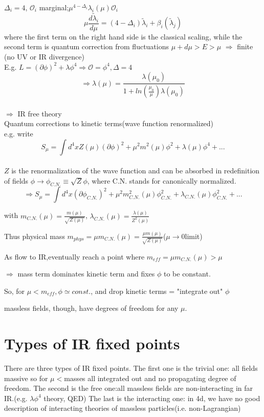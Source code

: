 \documentclass[type = bachelor]{fduthesis-en}
\begin{document}
$\Delta_i = 4$, $\mathcal{O}_i$ marginal;$\mu^{4-\Delta_i}\lambda_i(\mu)\mathcal{O}_i$\\
$$\mu\frac{d\tilde{\lambda}_i}{d\mu}=(4-\Delta_i)\tilde{\lambda}_i+\beta_i(\tilde{\lambda}_j)$$
where the first term on the right hand side is the classical scaling, while the second term is quantum correction from fluctuations $\mu +d\mu>E>\mu$ $\Rightarrow$ finite (no UV or IR divergence)
\\E.g. $L=(\partial\phi)^2+\lambda\phi^4 \Rightarrow \mathcal{O}=\phi^4, \Delta = 4$
\\$$\Rightarrow \lambda(\mu)=\frac{\lambda(\mu_0)}{1+ln(\frac{\mu_0}{\mu})\lambda(\mu_0)}$$
\\$\Rightarrow$ IR free theory\\
\bigskip Quantum corrections to kinetic terms(wave function renormalized)
\\e.g. write $$S_{\mu}=\int d^4x{Z(\mu)(\partial\phi)^2+\mu^2m^2(\mu)\phi^2+\lambda(\mu)\phi^4+...}$$\\
$Z$ is the renormalization of the wave function and can be absorbed in redefinition of fields $\phi \rightarrow \phi_{C.N.}\equiv \sqrt{Z}\phi$, where C.N. stands for canonically normalized.
$$\Rightarrow S_{\mu}=\int d^4x{(\partial\phi_{C.N.})^2+\mu^2m_{C.N.}^2(\mu)\phi_{C.N.}^2+\lambda_{C.N.}(\mu)\phi_{C.N.}^2+...}$$

with $m_{C.N.}(\mu)=\frac{m(\mu)}{\sqrt{Z(\mu)}}$, $\lambda_{C.N.}(\mu)=\frac{\lambda(\mu)}{Z^2(\mu)}$

Thus physical mass $m_{phys}=\mu m_{C.N.}(\mu)=\frac{\mu m(\mu)}{\sqrt{Z(\mu)}}$($\mu\rightarrow0$limit)

\bigskip As flow to IR,eventually reach a point where $m_{eff}=\mu m_{C.N.}(\mu)>\mu$

$\Rightarrow$ mass term dominates kinetic term and fixes $\phi$ to be constant.

So, for $\mu<m_{eff}, \phi\simeq const.$, and drop kinetic terms = "integrate out" $\phi$

massless fields, though, have degrees of freedom for any $\mu$.

\section{Types of IR fixed points}
There are three types of IR fixed points. The first one is the trivial one: all fields massive so for $\mu<$masses all integrated out and no propagating degree of freedom. The second is the free one:all massless fields are non-interacting in far IR.(e.g. $\lambda\phi^4$ theory, QED) The last is the interacting one: in 4d, we have no good description of interacting theories of massless particles(i.e. non-Lagrangian)
\end{document}
